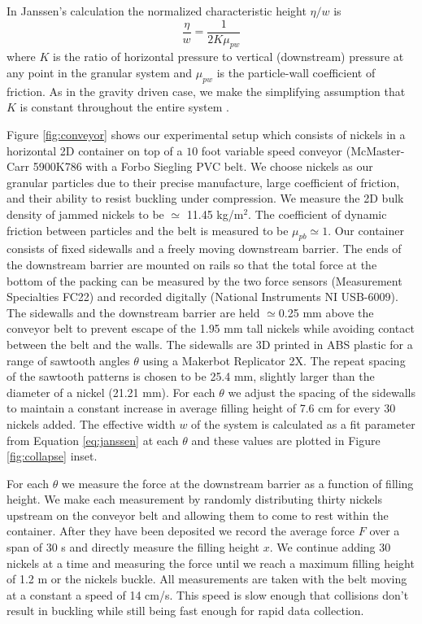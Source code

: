 In Janssen's calculation the normalized characteristic height $\eta/w$ is
\begin{equation} 
\frac{\eta}{w}=\frac{1}{2K\mu_{pw}}
\label{eq:eta}
\end{equation}
where $K$ is the ratio of horizontal pressure to vertical (downstream) pressure at any point in the granular system and $\mu_{pw}$ is the particle-wall coefficient of friction. As in the gravity driven case, we make the simplifying assumption that $K$ is constant throughout the entire system \cite{janssen_versuche_1895, sperl_experiments_2006, duran_sands_2000}.



Figure \ref{fig:conveyor} shows our experimental setup which consists of nickels in a horizontal 2D container on top of a $10$ foot variable speed conveyor (McMaster-Carr 5900K786 with a Forbo Siegling PVC belt.  We choose nickels as our granular particles due to their precise manufacture, large coefficient of friction, and their ability to resist buckling under compression.  We measure the 2D bulk density of jammed nickels to be $\simeq$ 11.45 kg/m$^{2}$. The coefficient of dynamic friction between particles and the belt is measured to be $\mu_{pb} \simeq 1$.  Our container consists of fixed sidewalls and a freely moving downstream barrier.  The ends of the downstream barrier are mounted on rails so that the total force at the bottom of the packing can be measured by the two force sensors (Measurement Specialties FC22) and recorded digitally (National Instruments NI USB-6009).  The sidewalls and the downstream barrier are held $\simeq$0.25 mm above the conveyor belt to prevent escape of the 1.95 mm tall nickels while avoiding contact between the belt and the walls.  The sidewalls are 3D printed in ABS plastic for a range of sawtooth angles $\theta$ using a Makerbot Replicator 2X. The repeat spacing of the sawtooth patterns is chosen to be 25.4 mm, slightly larger than the diameter of a nickel (21.21 mm).  For each $\theta$ we adjust the spacing of the sidewalls to maintain a constant increase in average filling height of 7.6 cm for every 30 nickels added. The effective width $w$ of the system is calculated as a fit parameter from Equation \ref{eq:janssen} at each $\theta$ and these values are plotted in Figure \ref{fig:collapse} inset. 


For each $\theta$ we measure the force at the downstream barrier as a function of filling height.  We make each measurement by randomly distributing thirty nickels upstream on the conveyor belt and allowing them to come to rest within the container.  After they have been deposited we record the average force $F$ over a span of 30 s and directly measure the filling height $x$.  We continue adding 30 nickels at a time and measuring the force until we reach a maximum filling height of 1.2 m or the nickels buckle.   All measurements are taken with the belt moving at a constant a speed of 14 cm/s. This speed is slow enough that collisions don't result in buckling while still being fast enough for rapid data collection.  

